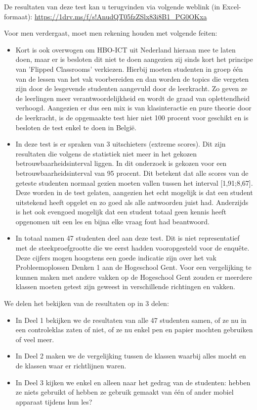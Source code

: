 De resultaten van deze test kan u terugvinden via volgende weblink (in Excel-formaat): \url{https://1drv.ms/f/s!AnudQT05fzZSlx83i8B1_PG0OKxa}

Voor men verdergaat, moet men rekening houden met volgende feiten:
\begin{itemize}
	\item Kort is ook overwogen om HBO-ICT uit Nederland hieraan mee te laten doen, maar er is besloten dit niet te doen aangezien zij sinds kort het principe van 'Flipped Classrooms' verkiezen. Hierbij moeten studenten in groep één van de lessen van het vak voorbereiden en dan worden de topics die vergeten zijn door de lesgevende studenten aangevuld door de leerkracht. Zo geven ze de leerlingen meer verantwoordelijkheid en wordt de graad van oplettendheid verhoogd. Aangezien er dus een mix is van klasinteractie en pure theorie door de leerkracht, is de opgemaakte test hier niet 100 procent voor geschikt en is besloten de test enkel te doen in België.
	\item In deze test is er spraken van 3 uitschieters (extreme scores). Dit zijn resultaten die volgens de statistiek niet meer in het gekozen betrouwbaarheidsinterval liggen. In dit onderzoek is gekozen voor een betrouwbaarheidsinterval van 95 procent. Dit betekent dat alle scores van de geteste studenten normaal gezien moeten vallen tussen het interval [1,91;8,67]. Deze worden in de test gelaten, aangezien het echt mogelijk is dat een student uitstekend heeft opgelet en zo goed als alle antwoorden juist had. Anderzijds is het ook evengoed mogelijk dat een student totaal geen kennis heeft opgenomen uit een les en bijna elke vraag fout had beantwoord.
	\item In totaal namen 47 studenten deel aan deze test. Dit is niet representatief met de steekproefgrootte die we eerst hadden vooropgesteld voor de enquête. Deze cijfers mogen hoogstens een goede indicatie zijn over het vak Probleemoplossen Denken 1 aan de Hogeschool Gent. Voor een vergelijking te kunnen maken met andere vakken op de Hogeschool Gent zouden er meerdere klassen moeten getest zijn geweest in verschillende richtingen en vakken.
\end{itemize}

We delen het bekijken van de resultaten op in 3 delen:

\begin{itemize}
	\item In Deel 1 bekijken we de resultaten van alle 47 studenten samen, of ze nu in een controleklas zaten of niet, of ze nu enkel pen en papier mochten gebruiken of veel meer.
	\item In Deel 2 maken we de vergelijking tussen de klassen waarbij alles mocht en de klassen waar er richtlijnen waren.
	\item In Deel 3 kijken we enkel en alleen naar het gedrag van de studenten: hebben ze niets gebruikt of hebben ze gebruik gemaakt van één of ander mobiel apparaat tijdens hun les?
\end{itemize}

